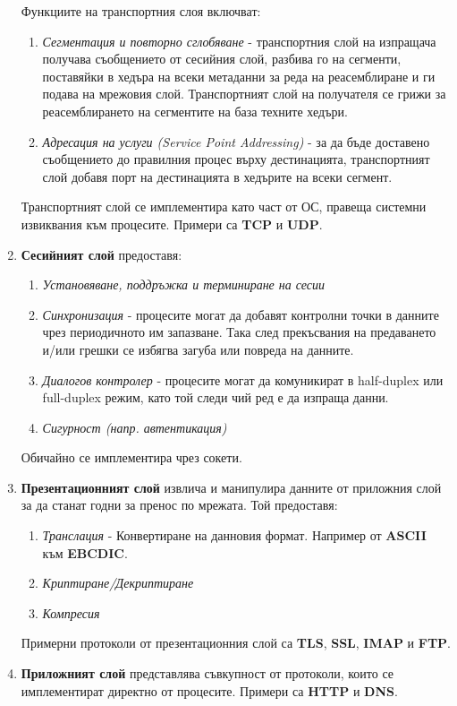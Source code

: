 \documentclass[fleqn,12pt]{article}
\begin{document}
\begin{flushleft}
\begin{enumerate}
    Функциите на транспортния слоя включват:
    \begin{enumerate}
        \item \textit{Сегментация и повторно сглобяване} - транспортния слой на изпращача получава съобщението от сесийния слой, разбива го на сегменти, поставяйки в хедъра на всеки метаданни за реда на реасемблиране и ги подава на мрежовия слой.
        Транспортният слой на получателя се грижи за реасемблирането на сегментите на база техните хедъри.
        \item \textit{Адресация на услуги (Service Point Addressing)} - за да бъде доставено съобщението до правилния процес върху дестинацията, транспортният слой добавя порт на дестинацията в хедърите на всеки сегмент.
    \end{enumerate}
    Транспортният слой се имплементира като част от ОС, правеща системни извиквания към процесите. Примери са \textbf{TCP} и \textbf{UDP}.
    \item \textbf{Сесийният слой} предоставя:
    \begin{enumerate}
        \item \textit{Установяване, поддръжка и терминиране на сесии}
        \item \textit{Синхронизация} - процесите могат да добавят контролни точки в данните чрез периодичното им запазване.
        Така след прекъсвания на предаването и/или грешки се избягва загуба или повреда на данните.
        \item \textit{Диалогов контролер} - процесите могат да комуникират в half-duplex или full-duplex режим, като той следи чий ред е да изпраща данни.
        \item \textit{Сигурност (напр. автентикация)}
    \end{enumerate}
    Обичайно се имплементира чрез сокети.
    \item \textbf{Презентационният слой} извлича и манипулира данните от приложния слой за да станат годни за пренос по мрежата. Той предоставя:
    \begin{enumerate}
        \item \textit{Транслация} - Конвертиране на данновия формат. Например от \textbf{ASCII} към \textbf{EBCDIC}.
        \item \textit{Криптиране/Декриптиране}
        \item \textit{Компресия}
    \end{enumerate}
    Примерни протоколи от презентационния слой са \textbf{TLS}, \textbf{SSL}, \textbf{IMAP} и \textbf{FTP}.
    \item \textbf{Приложният слой} представлява съвкупност от протоколи, които се имплементират директно от процесите. Примери са \textbf{HTTP} и \textbf{DNS}.
\end{enumerate}


\end{flushleft}
\end{document}
